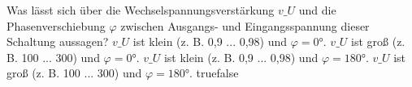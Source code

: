     {Was lässt sich über die Wechselspannungsverstärkung $v\_U$ und die Phasenverschiebung $\varphi$ zwischen Ausgangs- und Eingangsspannung dieser Schaltung aussagen?}
    {$v\_U$ ist klein (z. B. 0,9 ... 0,98) und $\varphi = 0 °$.}
    {$v\_U$ ist groß (z. B. 100 ... 300) und $\varphi = 0 °$.}
    {$v\_U$ ist klein (z. B. 0,9 ... 0,98) und $\varphi = 180 °$.}
    {$v\_U$ ist groß (z. B. 100 ... 300) und $\varphi = 180 °$.}
    {true}{false}